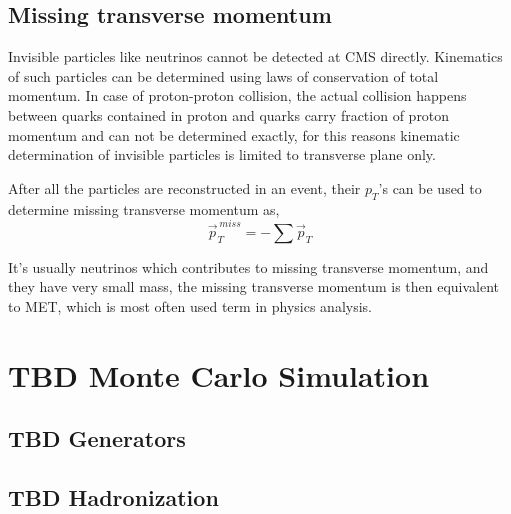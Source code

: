 \subsection{
  Missing transverse momentum
}

Invisible particles like neutrinos cannot be detected at \gls{CMS} directly.
Kinematics of such particles can be determined using laws of conservation of
total momentum. In case of proton-proton collision,
the actual collision happens between quarks contained in
proton and quarks carry fraction of proton momentum
and can not be determined exactly, for this reasons kinematic determination
of invisible particles is limited to transverse plane only.

After all the particles are reconstructed in an event, their \( p_T \)'s
can be used to determine missing transverse momentum as,
%
\begin{equation}
  \vec{p}_{T}^{~miss} = - \sum \vec{p}_{T}
\end{equation}

It's usually neutrinos which contributes to missing transverse momentum,
and they have very small mass, the missing transverse momentum is then
equivalent to \gls{MET}, which is most often used term in physics analysis.

\section{
  \textbf{TBD} Monte Carlo Simulation
 }

\subsection{
  \textbf{TBD} Generators
}

\subsection{
  \textbf{TBD} Hadronization
}
